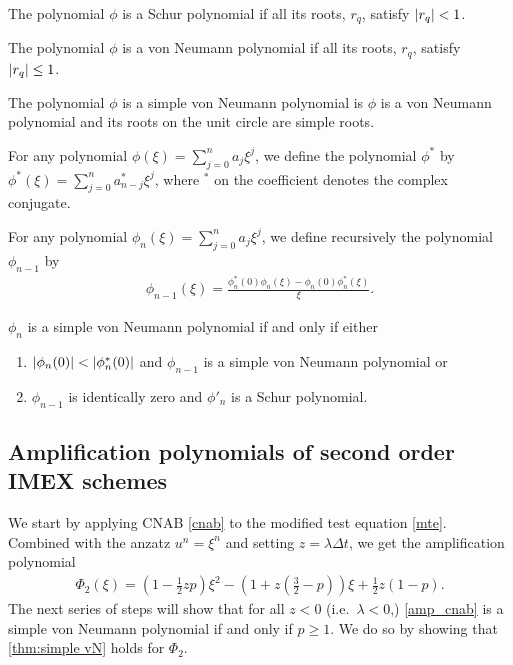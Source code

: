 \begin{definition}
	The polynomial $\phi$ is a Schur polynomial if all its roots, $r_q$, satisfy $\left|r_q\right| < 1$.
\end{definition}
\begin{definition}
        The polynomial $\phi$ is a von Neumann polynomial if all its roots, $r_q$, satisfy $\left|r_q\right|\leq 1$.
\end{definition}
\begin{definition}
	The polynomial $\phi$ is a simple von Neumann polynomial is $\phi$ is a von Neumann polynomial and its roots on the unit circle are simple roots.
\end{definition}
\begin{definition}
	For any polynomial $\phi(\xi) = \sum^n_{j=0} a_j\xi^j$, we define the polynomial $\phi^*$ by $\phi^*(\xi) = \sum^n_{j=0} a^*_{n-j} \xi^j$, where $^*$ on the coefficient denotes the complex conjugate.
\label{defn:conj}
\end{definition}
\begin{definition}
	For any polynomial $\phi_n(\xi) = \sum^n_{j=0} a_j\xi^j$, we define recursively the polynomial $\phi_{n-1}$ by
	\begin{align}
	\phi_{n-1}(\xi) = \frac{\phi_n^*(0)\phi_n(\xi) - \phi_n(0)\phi_n^*(\xi)}{\xi}.
	\end{align} 
\label{defn:recurse}
\end{definition}
\begin{theorem}
	$\phi_n$ is a simple von Neumann polynomial if and only if either 
	\begin{enumerate}[label=(\alph{*})]
		\item $\left|\phi_n(0)\right| < \left|\phi^*_n(0)\right|$ and $\phi_{n-1}$ is a simple von Neumann polynomial or
		
		\item $\phi_{n-1}$ is identically zero and $\phi'_{n}$ is a Schur polynomial.
	\end{enumerate}
\label{thm:simple vN}
\end{theorem}

\subsection{Amplification polynomials of second order IMEX schemes}
We start by applying CNAB \eqref{cnab} to the modified test equation \eqref{mte}. Combined with the anzatz $u^n = \xi^n$ and setting $z=\lambda\Delta t$, we get the amplification polynomial
\begin{align}
\Phi_2(\xi) 
= \left(1 - \frac{1}{2}zp\right)\xi^2
- \left(1 + z\left(\frac{3}{2}-p \right)\right)\xi + \frac{1}{2}z(1-p).
\label{amp_cnab}
\end{align}
The next series of steps will show that for all $z<0$ (i.e.\ $\lambda < 0$,) \eqref{amp_cnab} is a simple von Neumann polynomial if and only if $p\geq 1$. We do so by showing that \cref{thm:simple vN} holds for $\Phi_2$.

